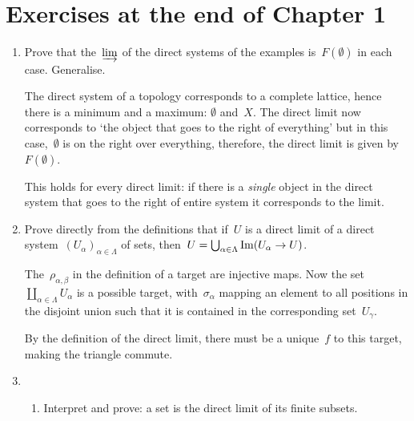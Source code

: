 \documentclass[a4paper,11pt,oneside,openany,article]{memoir}
\begin{document}
\title{}
\author{
  Pieter Belmans
}
\maketitle

\tableofcontents*

\chapter{Exercises at the end of Chapter 1}
\begin{enumerate}
  \item Prove that the~$\varinjlim$ of the direct systems of the examples is~$F(\emptyset)$ in each case. Generalise.

    \begin{solution}
      The direct system of a topology corresponds to a complete lattice, hence there is a minimum and a maximum: $\emptyset$ and~$X$. The direct limit now corresponds to `the object that goes to the right of everything' but in this case,~$\emptyset$ is on the right over everything, therefore, the direct limit is given by~$F(\emptyset)$.

      This holds for every direct limit: if there is a \emph{single} object in the direct system that goes to the right of entire system it corresponds to the limit.
    \end{solution}

  \item Prove directly from the definitions that if~$U$ is a direct limit of a direct system~$(U_\alpha)_{\alpha\in\Lambda}$ of sets, then~$U=\bigcup_{\alpha\in\Lambda}\operatorname{Im}(U_\alpha\rightarrow U)$.

    \begin{solution}
      The~$\rho_{\alpha,\beta}$ in the definition of a target are injective maps. Now the set~$\coprod_{\alpha\in\Lambda}U_\alpha$ is a possible target, with~$\sigma_\alpha$ mapping an element to all positions in the disjoint union such that it is contained in the corresponding set~$U_\gamma$.

      By the definition of the direct limit, there must be a unique~$f$ to this target, making the triangle commute.
    \end{solution}

  \item
    \begin{enumerate}
      \item Interpret and prove: a set is the direct limit of its finite subsets.
      

\end{enumerate}
\end{enumerate}
\end{document}
